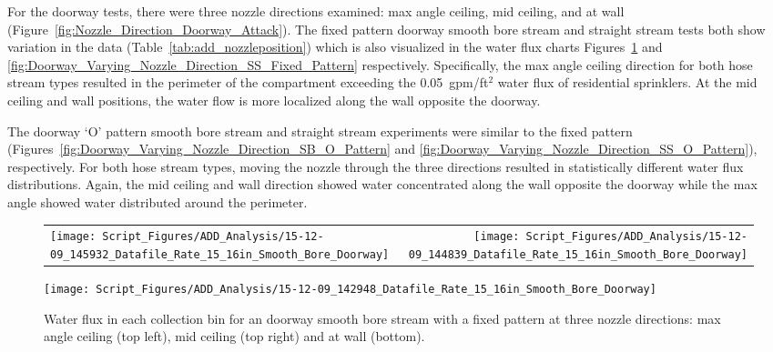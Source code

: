 \documentclass[12pt,oneside]{book}
\begin{document}
For the doorway tests, there were three nozzle directions examined: max angle ceiling, mid ceiling, and at wall (Figure~\ref{fig:Nozzle_Direction_Doorway_Attack}). The fixed pattern doorway smooth bore stream and straight stream tests both show variation in the data (Table~\ref{tab:add_nozzleposition}) which is also visualized in the water flux charts Figures~\ref{fig:Doorway_Varying_Nozzle_Direction_SB_Fixed_Pattern} and \ref{fig:Doorway_Varying_Nozzle_Direction_SS_Fixed_Pattern} respectively. Specifically, the max angle ceiling direction for both hose stream types resulted in the perimeter of the compartment exceeding the 0.05~gpm/ft$^2$ water flux of residential sprinklers. At the mid ceiling and wall positions, the water flow is more localized along the wall opposite the doorway.

The doorway `O' pattern smooth bore stream and straight stream experiments were similar to the fixed pattern (Figures~\ref{fig:Doorway_Varying_Nozzle_Direction_SB_O_Pattern} and \ref{fig:Doorway_Varying_Nozzle_Direction_SS_O_Pattern}), respectively. For both hose stream types, moving the nozzle through the three directions resulted in statistically different water flux distributions. Again, the mid ceiling and wall direction showed water concentrated along the wall opposite the doorway while the max angle showed water distributed around the perimeter. 

\begin{figure}[ht]
\begin{tabular*}{\textwidth}{lr}
\texttt{[image: Script\_Figures/ADD\_Analysis/15-12-09\_145932\_Datafile\_Rate\_15\_16in\_Smooth\_Bore\_Doorway]} &
\texttt{[image: Script\_Figures/ADD\_Analysis/15-12-09\_144839\_Datafile\_Rate\_15\_16in\_Smooth\_Bore\_Doorway]} \\
\end{tabular*}
\centering
\texttt{[image: Script\_Figures/ADD\_Analysis/15-12-09\_142948\_Datafile\_Rate\_15\_16in\_Smooth\_Bore\_Doorway]}
\caption[Water Flux for Varying Nozzle Direction with Fixed Doorway Smooth Bore Stream]{Water flux in each collection bin for an doorway smooth bore stream with a fixed pattern at three nozzle directions: max angle ceiling (top left), mid ceiling (top right) and at wall (bottom).}
\label{fig:Doorway_Varying_Nozzle_Direction_SB_Fixed_Pattern}
\end{figure}
\end{document}
